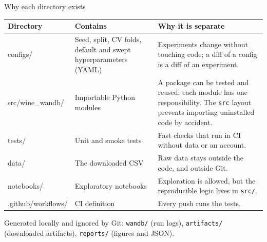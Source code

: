 \begin{frame}{Why each directory exists}
\begingroup\footnotesize
\begin{tabularx}{\textwidth}{>{\ttfamily}l X X}
\normalfont\bfseries Directory & \bfseries Contains & \bfseries Why it is separate \\
\toprule
configs/ & Seed, split, CV folds, default and swept hyperparameters (YAML) & Experiments change without touching code; a diff of a config is a diff of an experiment. \\
\addlinespace[0.3em]
src/wine\_wandb/ & Importable Python modules & A package can be tested and reused; each module has one responsibility. The \texttt{src} layout prevents importing uninstalled code by accident. \\
\addlinespace[0.3em]
tests/ & Unit and smoke tests & Fast checks that run in CI without data or an account. \\
\addlinespace[0.3em]
data/ & The downloaded CSV & Raw data stays outside the code, and outside Git. \\
\addlinespace[0.3em]
notebooks/ & Exploratory notebooks & Exploration is allowed, but the reproducible logic lives in \texttt{src/}. \\
\addlinespace[0.3em]
.github/workflows/ & CI definition & Every push runs the tests. \\
\bottomrule
\end{tabularx}
\par\endgroup
\vspace{0.3em}
{\scriptsize Generated locally and ignored by Git: \texttt{wandb/} (run logs), \texttt{artifacts/} (downloaded artifacts), \texttt{reports/} (figures and JSON).\par}
\coursefooter
\end{frame}

